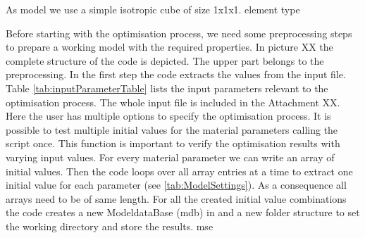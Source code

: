 As model we use a simple isotropic cube of size 1x1x1.
element type


Before starting with the optimisation process, we need some preprocessing steps to prepare a working  model with the required properties. In picture XX the complete structure of the code is depicted. The upper part belongs to the preprocessing. In the first step the code extracts the values from the input file. Table \autoref{tab:inputParameterTable} lists the input parameters relevant to the optimisation process. The whole input file is included in the Attachment XX. Here the user has multiple options to specify the optimisation process. It is possible to test multiple initial values for the material parameters calling the script once. This function is important to verify the optimisation results with varying input values. For every material parameter we can write an array of initial values. Then the code loops over all array entries at a time to extract one initial value for each parameter (see \autoref{tab:ModelSettings}). As a consequence all arrays need to be of same length. For all the created initial value combinations the code creates a new ModeldataBase (mdb) in  and a new folder structure to set the working directory and store the results. \acrfull{mse}


